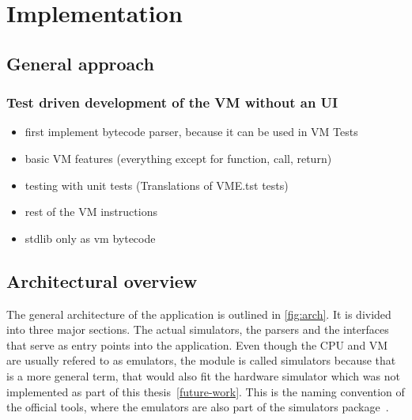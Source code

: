 \section{Implementation} \label{implementation}

\subsection{General approach}
\subsubsection{Test driven development of the VM without an UI}
\begin{itemize}
  \item first implement bytecode parser, because it can be used in VM Tests
  \item basic VM features (everything except for function, call, return)
  \item testing with unit tests (Translations of VME.tst tests)
  \item rest of the VM instructions
  \item stdlib only as vm bytecode
\end{itemize}

\subsection{Architectural overview}
The general architecture of the application is outlined in \cref{fig:arch}.
It is divided into three major sections. The actual simulators, the parsers and the interfaces that serve as entry points into the application. Even though the CPU and VM are usually refered to as emulators, the module is called simulators because that is a more general term, that would also fit the hardware simulator which was not implemented as part of this thesis~\ref{future-work}. This is the naming convention of the official tools, where the emulators are also part of the simulators package~\cite{n2tsimulators}.


